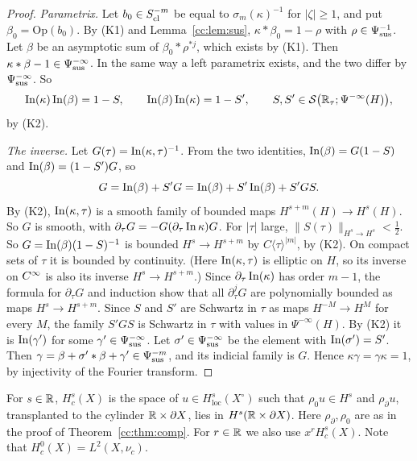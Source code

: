\begin{proof}
\emph{Parametrix.} Let \(b_0\in S_{\mathrm{cl}}^{-m}\) be equal to
\(\sigma_m(\kappa)^{-1}\) for \(|\zeta|\ge1\), and put
\(\beta_0=\mathrm{Op}(b_0)\). By (K1) and Lemma~\ref{cc:lem:sus},
\(\kappa*\beta_0=1-\rho\) with \(\rho\in\Psi_{\mathrm{sus}}^{-1}\). Let \(\beta\) be an
asymptotic sum of \(\beta_0*\rho^{*j}\), which exists by (K1). Then
\(\kappa*\beta-1\in\Psi_{\mathrm{sus}}^{-\infty}\). In the same way a left parametrix
exists, and the two differ by \(\Psi_{\mathrm{sus}}^{-\infty}\). So
\[
 \operatorname{In}(\kappa)\operatorname{In}(\beta)=1-S,\qquad\operatorname{In}(\beta)\operatorname{In}(\kappa)=1-S',\qquad
 S,S'\in\mathcal S\bigl(\mathbb R_\tau;\Psi^{-\infty}(H)\bigr),
\]
by (K2).

\emph{The inverse.} Let \(G(\tau)=\operatorname{In}(\kappa,\tau)^{-1}\). From the two
identities, \(\operatorname{In}(\beta)=G(1-S)\) and \(\operatorname{In}(\beta)=(1-S')G\), so
\[
 G=\operatorname{In}(\beta)+S'G=\operatorname{In}(\beta)+S'\operatorname{In}(\beta)+S'GS .
\]
By (K2), \(\operatorname{In}(\kappa,\tau)\) is a smooth family of bounded maps
\(H^{s+m}(H)\to H^s(H)\). So \(G\) is smooth, with
\(\partial_\tau G=-G(\partial_\tau\operatorname{In}\kappa)G\). For \(|\tau|\) large,
\(\|S(\tau)\|_{H^s\to H^s}<\frac12\). So \(G=\operatorname{In}(\beta)(1-S)^{-1}\) is
bounded \(H^s\to H^{s+m}\) by \(C\langle\tau\rangle^{|m|}\), by (K2). On compact sets of \(\tau\) it is bounded by continuity. (Here
\(\operatorname{In}(\kappa,\tau)\) is elliptic on \(H\), so its inverse on \(C^\infty\) is
also its inverse \(H^s\to H^{s+m}\).) Since \(\partial_\tau\operatorname{In}(\kappa)\)
has order \(m-1\), the formula for \(\partial_\tau G\) and induction show
that all \(\partial_\tau^jG\) are polynomially bounded as maps \(H^s\to
H^{s+m}\). Since \(S\) and \(S'\) are Schwartz in \(\tau\) as maps
\(H^{-M}\to H^M\) for every \(M\), the family \(S'GS\) is Schwartz in
\(\tau\) with values in \(\Psi^{-\infty}(H)\). By (K2) it is
\(\operatorname{In}(\gamma')\) for some \(\gamma'\in\Psi_{\mathrm{sus}}^{-\infty}\). Let
\(\sigma'\in\Psi_{\mathrm{sus}}^{-\infty}\) be the element with \(\operatorname{In}(\sigma')=S'\).
Then \(\gamma=\beta+\sigma'*\beta+\gamma'\in\Psi_{\mathrm{sus}}^{-m}\), and its
indicial family is \(G\). Hence \(\kappa\gamma=\gamma\kappa=1\), by injectivity of the
Fourier transform.
\end{proof}

\begin{definition}\label{cc:def:sobolev}
For \(s\in\mathbb R\), \(H^s_c(X)\) is the space of \(u\in H^s_{\mathrm{loc}}
(X^\circ)\) such that \(\rho_0u\in H^s\) and \(\rho_\partial u\),
transplanted to the cylinder \(\mathbb R\times\partial X\), lies in
\(H^s(\mathbb R\times\partial X)\). Here \(\rho_\partial,\rho_0\) are as in the
proof of Theorem~\ref{cc:thm:comp}. For \(r\in\mathbb R\) we also use
\(x^rH^s_c(X)\). Note that \(H^0_c(X)=L^2(X,\nu_c)\).
\end{definition}

